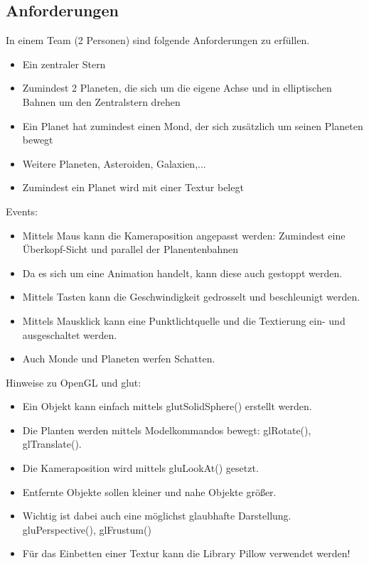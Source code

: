 \documentclass[12pt,a4paper,oneside,ngerman]{scrartcl}
\begin{document}
\subsection{Anforderungen}
In einem Team (2 Personen) sind folgende Anforderungen zu erfüllen.

\begin{itemize}
\item Ein zentraler Stern
\item Zumindest 2 Planeten, die sich um die eigene Achse und in elliptischen Bahnen um den Zentralstern drehen
\item Ein Planet hat zumindest einen Mond, der sich zusätzlich um seinen Planeten bewegt
\item Weitere Planeten, Asteroiden, Galaxien,...
\item Zumindest ein Planet wird mit einer Textur belegt
\end{itemize}

Events:

\begin{itemize}
\item Mittels Maus kann die Kameraposition angepasst werden: Zumindest eine Überkopf-Sicht und parallel der Planentenbahnen
\item Da es sich um eine Animation handelt, kann diese auch gestoppt werden.
\item Mittels Tasten kann die Geschwindigkeit gedrosselt und beschleunigt werden.
\item Mittels Mausklick kann eine Punktlichtquelle und die Textierung ein- und ausgeschaltet werden.
\item Auch Monde und Planeten werfen Schatten.
\end{itemize}

Hinweise zu OpenGL und glut:

\begin{itemize}
\item Ein Objekt kann einfach mittels glutSolidSphere() erstellt werden.
\item Die Planten werden mittels Modelkommandos bewegt: glRotate(), glTranslate().
\item Die Kameraposition wird mittels gluLookAt() gesetzt.
\item Entfernte Objekte sollen kleiner und nahe Objekte größer.
\item Wichtig ist dabei auch eine möglichst glaubhafte Darstellung. \newline gluPerspective(), glFrustum()
\item Für das Einbetten einer Textur kann die Library Pillow verwendet werden!
\end{itemize}
\newpage
\end{document}
